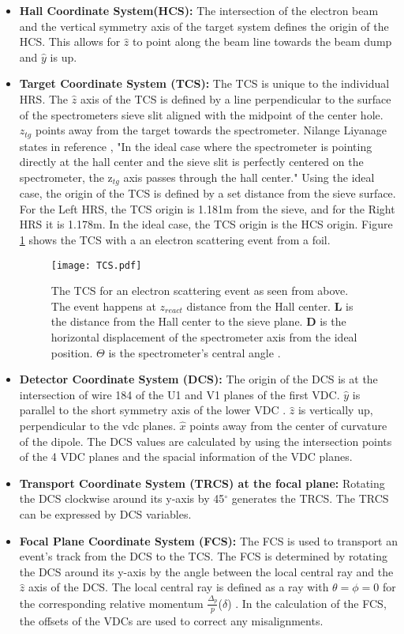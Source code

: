 \begin{itemize}
	\item \textbf{Hall Coordinate System(HCS):} The intersection of the electron beam and the vertical symmetry axis of the target system defines the origin of the HCS. This allows for $\hat{z}$ to point along the beam line towards the beam dump and $\hat{y}$ is up. 
	\item \textbf{Target Coordinate System (TCS):} The TCS is unique to the individual HRS. The $\hat{z}$ axis of the TCS is defined by a line perpendicular to the surface of the spectrometers sieve slit aligned with the midpoint of the center hole. $z_{tg}$ points away from the target towards the spectrometer. Nilange Liyanage states in reference \cite{optics}, "In the ideal case where the spectrometer is pointing directly at the hall center and the sieve slit is perfectly centered on the spectrometer, the z$_{tg}$ axis passes through the hall center." Using the ideal case, the origin of the TCS is defined by a set distance from the sieve surface. For the Left HRS, the TCS origin is 1.181m from the sieve, and for the Right HRS it is 1.178m. In the ideal case, the TCS origin is the HCS origin. Figure \ref{fig:TCS} shows the TCS with a an electron scattering event from a foil.  
	\begin{figure}[t]
		\centering
		\texttt{[image: TCS.pdf]}
		\caption{The TCS for an electron scattering event as seen from above. The event happens at $z_{react}$ distance from the Hall center. \textbf{L} is the distance from the Hall center to the sieve plane. \textbf{D} is the horizontal displacement of the spectrometer axis from the ideal position. $\Theta$ is the spectrometer's central angle \cite{optics}. }
		\label{fig:TCS}
	\end{figure}
	\item \textbf{Detector Coordinate System (DCS):}  The origin of the DCS is at the intersection of wire 184 of the U1 and V1 planes of the first VDC. $\hat{y}$ is parallel to the short symmetry axis of the lower VDC \cite{espace}. $\hat{z}$ is vertically up, perpendicular to the vdc planes.  $\hat{x}$  points away from the center of curvature of the dipole. The DCS values are calculated by using the intersection points of the 4 VDC planes and the spacial information of the VDC planes.
	\item \textbf{Transport Coordinate System (TRCS) at the focal plane:} Rotating the DCS clockwise around its y-axis by 45$^\circ$ generates the TRCS. The TRCS can be expressed by  DCS variables. 	
	\item \textbf{Focal Plane Coordinate System (FCS):} The FCS is used to transport an event's track from the DCS to the TCS. The FCS is determined by rotating the DCS around its y-axis by the angle between the local central ray and the $\hat{z}$ axis of the DCS. The local central ray is defined as a ray with $\theta = \phi =0$ for the corresponding relative momentum $\frac{\Delta_p}{p}$($\delta$) \cite{optics}. In the calculation of the FCS, the offsets of the VDCs are used to correct any misalignments.  
\end{itemize}

